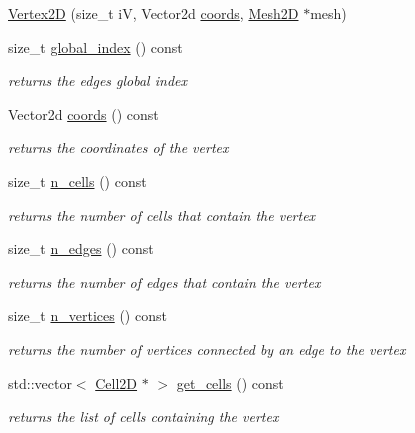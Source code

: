 \begin{DoxyCompactItemize}
\item 
\hyperlink{classMeshFramework2D_1_1Vertex2D_ae759dbca494a48ef69b92822ee1a29df}{Vertex2D} (size\+\_\+t iV, Vector2d \hyperlink{group__Mesh2D_gae45824e66b060683ed5e9f020e1e551b}{coords}, \hyperlink{classMeshFramework2D_1_1Mesh2D}{Mesh2D} $\ast$mesh)
\item 
size\+\_\+t \hyperlink{group__Mesh2D_ga9dfca7a1aa74b26517d6a7f877e875cb}{global\+\_\+index} () const
\begin{DoxyCompactList}\small\item\em returns the edges global index \end{DoxyCompactList}\item 
Vector2d \hyperlink{group__Mesh2D_gae45824e66b060683ed5e9f020e1e551b}{coords} () const
\begin{DoxyCompactList}\small\item\em returns the coordinates of the vertex \end{DoxyCompactList}\item 
size\+\_\+t \hyperlink{group__Mesh2D_ga54a6fbedfcaea25cecb796e9aca424f0}{n\+\_\+cells} () const
\begin{DoxyCompactList}\small\item\em returns the number of cells that contain the vertex \end{DoxyCompactList}\item 
size\+\_\+t \hyperlink{group__Mesh2D_gaa75d71635852fb4acc2d87bc113c0c42}{n\+\_\+edges} () const
\begin{DoxyCompactList}\small\item\em returns the number of edges that contain the vertex \end{DoxyCompactList}\item 
size\+\_\+t \hyperlink{group__Mesh2D_ga89c73bca4fe4c8ab8eadca0fad789909}{n\+\_\+vertices} () const
\begin{DoxyCompactList}\small\item\em returns the number of vertices connected by an edge to the vertex \end{DoxyCompactList}\item 
std\+::vector$<$ \hyperlink{classMeshFramework2D_1_1Cell2D}{Cell2D} $\ast$ $>$ \hyperlink{group__Mesh2D_gabacaec2f46a76bb5b4abf9bbcf1e242d}{get\+\_\+cells} () const
\begin{DoxyCompactList}\small\item\em returns the list of cells containing the vertex \end{DoxyCompactList}\item 

\end{DoxyCompactItemize}
